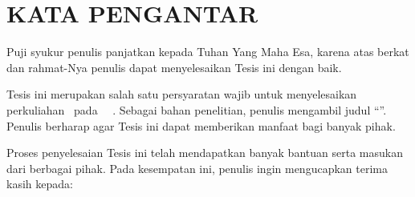 
\chapter*{KATA PENGANTAR}

Puji syukur penulis panjatkan kepada Tuhan Yang Maha Esa, karena atas
berkat dan rahmat-Nya penulis dapat menyelesaikan Tesis ini dengan
baik.

Tesis ini merupakan salah satu persyaratan wajib untuk menyelesaikan
perkuliahan \thesisProgramStudi\ pada \thesisFakultas\
\thesisUniversitas\ \thesisKotaTerbit. Sebagai bahan penelitian,
penulis mengambil judul ``\MakeUppercase{\thesisTitle}''. Penulis
berharap agar Tesis ini dapat memberikan manfaat bagi banyak pihak.

Proses penyelesaian Tesis ini telah mendapatkan banyak bantuan serta
masukan dari berbagai pihak. Pada kesempatan ini, penulis ingin
mengucapkan terima kasih kepada:

